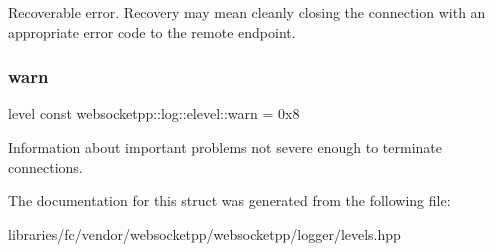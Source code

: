 Recoverable error. Recovery may mean cleanly closing the connection with an appropriate error code to the remote endpoint. \mbox{\label{structwebsocketpp_1_1log_1_1elevel_aef51fd791400121297f38f4381edaebe}} 
\subsubsection{\texorpdfstring{warn}{warn}}
{\footnotesize\ttfamily level const websocketpp\+::log\+::elevel\+::warn = 0x8\hspace{0.3cm}{\ttfamily [static]}}

Information about important problems not severe enough to terminate connections. 

The documentation for this struct was generated from the following file\+:\begin{DoxyCompactItemize}
\item 
libraries/fc/vendor/websocketpp/websocketpp/logger/levels.\+hpp\end{DoxyCompactItemize}
